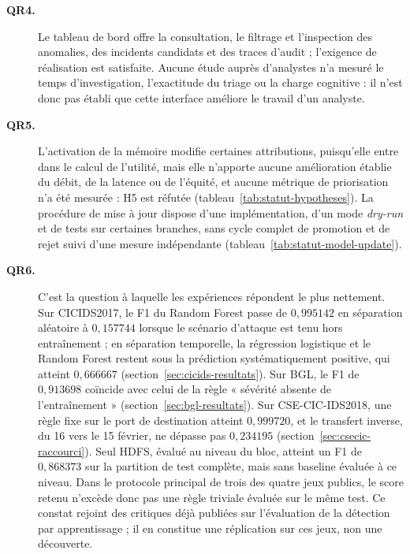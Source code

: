\begin{description}
    \item[\textbf{QR4.}]
    Le tableau de bord offre la consultation, le filtrage et l'inspection des anomalies, des incidents candidats et des traces d'audit ; l'exigence de réalisation est satisfaite. Aucune étude auprès d'analystes n'a mesuré le temps d'investigation, l'exactitude du triage ou la charge cognitive : il n'est donc pas établi que cette interface améliore le travail d'un analyste.

    \item[\textbf{QR5.}]
    L'activation de la mémoire modifie certaines attributions, puisqu'elle entre dans le calcul de l'utilité, mais elle n'apporte aucune amélioration établie du débit, de la latence ou de l'équité, et aucune métrique de priorisation n'a été mesurée : H5 est réfutée (tableau~\ref{tab:statut-hypotheses}). La procédure de mise à jour dispose d'une implémentation, d'un mode \textit{dry-run} et de tests sur certaines branches, sans cycle complet de promotion et de rejet suivi d'une mesure indépendante (tableau~\ref{tab:statut-model-update}).

    \item[\textbf{QR6.}]
    C'est la question à laquelle les expériences répondent le plus nettement. Sur CICIDS2017, le F1 du Random Forest passe de $0{,}995142$ en séparation aléatoire à $0{,}157744$ lorsque le scénario d'attaque est tenu hors entraînement ; en séparation temporelle, la régression logistique et le Random Forest restent sous la prédiction systématiquement positive, qui atteint $0{,}666667$ (section~\ref{sec:cicids-resultats}). Sur BGL, le F1 de $0{,}913698$ coïncide avec celui de la règle « sévérité absente de l'entraînement » (section~\ref{sec:bgl-resultats}). Sur CSE-CIC-IDS2018, une règle fixe sur le port de destination atteint $0{,}999720$, et le transfert inverse, du 16 vers le 15 février, ne dépasse pas $0{,}234195$ (section~\ref{sec:csecic-raccourci}). Seul HDFS, évalué au niveau du bloc, atteint un F1 de $0{,}868373$ sur la partition de test complète, mais sans baseline évaluée à ce niveau. Dans le protocole principal de trois des quatre jeux publics, le score retenu n'excède donc pas une règle triviale évaluée sur le même test. Ce constat rejoint des critiques déjà publiées sur l'évaluation de la détection par apprentissage \cite{sommer2010outside,arp2022dos,engelen2021troubleshooting} ; il en constitue une réplication sur ces jeux, non une découverte.

\end{description}

